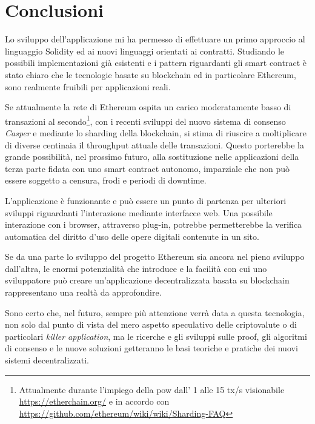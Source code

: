\section{Conclusioni}

Lo sviluppo dell'applicazione  mi ha permesso di effettuare un primo approccio al linguaggio Solidity ed ai nuovi linguaggi orientati ai contratti. Studiando le possibili implementazioni già esistenti e i pattern riguardanti gli smart contract è stato chiaro che le tecnologie basate su blockchain ed in particolare Ethereum, sono realmente fruibili per applicazioni reali.

Se attualmente la rete di Ethereum ospita un carico moderatamente basso di transazioni al secondo\footnote{Attualmente durante l'impiego della pow dall' 1 alle 15 tx/s visionabile \url{https://etherchain.org/} e in accordo con \url{https://github.com/ethereum/wiki/wiki/Sharding-FAQ}}, con i recenti sviluppi del nuovo sistema di consenso \textit{Casper} e mediante lo sharding della blockchain, si stima di riuscire a moltiplicare di diverse centinaia il throughput attuale delle transazioni.  
Questo porterebbe la grande possibilità, nel prossimo futuro, alla sostituzione nelle applicazioni della terza parte fidata con uno smart contract autonomo, imparziale che non può essere soggetto a censura, frodi e periodi di downtime.  

L'applicazione è funzionante e può essere un punto di partenza per ulteriori sviluppi riguardanti l'interazione mediante interfacce web. Una possibile interazione con i browser, attraverso plug-in, potrebbe permetterebbe la verifica automatica del diritto d'uso delle opere digitali contenute in un sito.
 
Se da una parte lo sviluppo del progetto Ethereum sia ancora nel pieno sviluppo dall'altra, le enormi potenzialità che introduce e la facilità con cui uno sviluppatore può creare un'applicazione decentralizzata basata su blockchain rappresentano una realtà da approfondire.
	
Sono certo che, nel futuro, sempre più attenzione verrà data a questa tecnologia, non solo dal punto di vista del mero aspetto speculativo delle criptovalute o di particolari \textit{killer application}, ma le ricerche e gli sviluppi sulle proof, gli algoritmi di consenso e le nuove soluzioni getteranno le basi teoriche e pratiche dei nuovi sistemi decentralizzati.

	